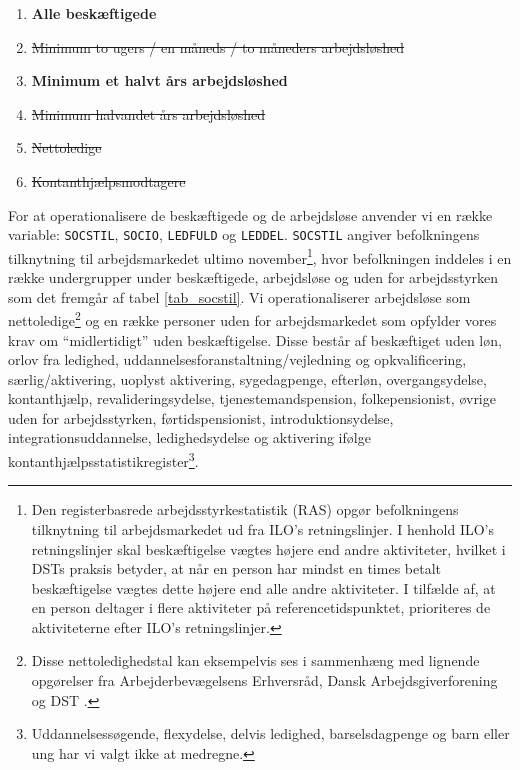 % 
\begin{enumerate} [topsep=6pt,itemsep=-1ex]
  \item \textbf{Alle beskæftigede}
  \item \sout{Minimum to ugers / en måneds / to måneders arbejdsløshed}
  \item \textbf{Minimum et halvt års arbejdsløshed}
  \item \sout{Minimum halvandet års arbejdsløshed}
  \item \sout{Nettoledige}
  \item \sout{Kontanthjælpsmodtagere}
\end{enumerate}
% 
\newpage For at operationalisere de beskæftigede og de arbejdsløse anvender vi en række variable: \texttt{SOCSTIL}, \texttt{SOCIO}, \texttt{LEDFULD} og \texttt{LEDDEL}. \texttt{SOCSTIL} angiver befolkningens tilknytning til arbejdsmarkedet ultimo november\footnote{Den registerbasrede arbejdsstyrkestatistik (RAS) opgør befolkningens tilknytning til arbejdsmarkedet ud fra ILO's retningslinjer. I henhold ILO's retningslinjer skal beskæftigelse vægtes højere end andre aktiviteter, hvilket i DSTs praksis betyder, at når en person har mindst en times betalt beskæftigelse vægtes dette højere end alle andre aktiviteter. I tilfælde af, at en person deltager i flere aktiviteter på referencetidspunktet, prioriteres de aktiviteterne efter ILO's retningslinjer.}, hvor befolkningen inddeles i en række undergrupper under beskæftigede, arbejdsløse og uden for arbejdsstyrken som det fremgår af tabel \ref{tab_socstil}. Vi operationaliserer arbejdsløse som nettoledige\footnote{Disse nettoledighedstal kan eksempelvis ses i sammenhæng med lignende opgørelser fra Arbejderbevægelsens Erhversråd\parencite{Bjoersted2012}, Dansk Arbejdsgiverforening \parencite{Bang-Petersen2012} og DST \parencite{DST2014a}.} og en række personer uden for arbejdsmarkedet som opfylder vores krav om “midlertidigt” uden beskæftigelse. Disse består af beskæftiget uden løn, orlov fra ledighed, uddannelsesforanstaltning/vejledning og opkvalificering, særlig/aktivering, uoplyst aktivering, sygedagpenge, efterløn, overgangsydelse, kontanthjælp, revalideringsydelse, tjenestemandspension, folkepensionist, øvrige uden for arbejdsstyrken, førtidspensionist, introduktionsydelse, integrationsuddannelse, ledighedsydelse og aktivering ifølge kontanthjælpsstatistikregister\footnote{Uddannelsessøgende, flexydelse, delvis ledighed, barselsdagpenge og barn eller ung har vi valgt ikke at medregne.}.
% 
